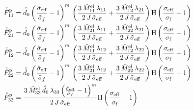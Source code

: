 \begin{align}
\dot{\tilde{F}}^{\mathrm p}_{11} &= \dot{\tilde{d}}_{0}\,{\left(\frac{\tilde{\sigma }_{\mathrm{eff}}}{\tilde{\sigma }_{f}}-1\right)}^m\,\left(\frac{3\,\tilde{M}_{11}^{\mathrm{el}}\,\lambda _{11}}{2\,J\,\tilde{\sigma }_{\mathrm{eff}}}+\frac{3\,\tilde{M}_{12}^{\mathrm{el}}\,\lambda _{21}}{2\,J\,\tilde{\sigma }_{\mathrm{eff}}}\right)\mathrm{H}\left( \frac{\sigma_{\rm{eff}}}{\sigma_{\rm{f}}} - 1\right)\\ 
\dot{\tilde{F}}^{\mathrm p}_{21} &= \dot{\tilde{d}}_{0}\,{\left(\frac{\tilde{\sigma }_{\mathrm{eff}}}{\tilde{\sigma }_{f}}-1\right)}^m\,\left(\frac{3\,\tilde{M}_{21}^{\mathrm{el}}\,\lambda _{11}}{2\,J\,\tilde{\sigma }_{\mathrm{eff}}}+\frac{3\,\tilde{M}_{22}^{\mathrm{el}}\,\lambda _{21}}{2\,J\,\tilde{\sigma }_{\mathrm{eff}}}\right) \mathrm{H}\left( \frac{\sigma_{\rm{eff}}}{\sigma_{\rm{f}}} - 1\right)\\ 
\dot{\tilde{F}}^{\mathrm p}_{12} &= \dot{\tilde{d}}_{0}\,{\left(\frac{\tilde{\sigma }_{\mathrm{eff}}}{\tilde{\sigma }_{f}}-1\right)}^m\,\left(\frac{3\,\tilde{M}_{11}^{\mathrm{el}}\,\lambda _{12}}{2\,J\,\tilde{\sigma }_{\mathrm{eff}}}+\frac{3\,\tilde{M}_{12}^{\mathrm{el}}\,\lambda _{22}}{2\,J\,\tilde{\sigma }_{\mathrm{eff}}}\right) \mathrm{H}\left( \frac{\sigma_{\rm{eff}}}{\sigma_{\rm{f}}} - 1\right)\\ 
\dot{\tilde{F}}^{\mathrm p}_{22} &= \dot{\tilde{d}}_{0}\,{\left(\frac{\tilde{\sigma }_{\mathrm{eff}}}{\tilde{\sigma }_{f}}-1\right)}^m\,\left(\frac{3\,\tilde{M}_{21}^{\mathrm{el}}\,\lambda _{12}}{2\,J\,\tilde{\sigma }_{\mathrm{eff}}}+\frac{3\,\tilde{M}_{22}^{\mathrm{el}}\,\lambda _{22}}{2\,J\,\tilde{\sigma }_{\mathrm{eff}}}\right) \mathrm{H}\left( \frac{\sigma_{\rm{eff}}}{\sigma_{\rm{f}}} - 1\right)\\ 
\dot{\tilde{F}}^{\mathrm p}_{33} &= \frac{3\,\tilde{M}_{33}^{\mathrm{el}}\,\dot{\tilde{d}}_{0}\,\lambda _{33}\,{\left(\frac{\tilde{\sigma }_{\mathrm{eff}}}{\tilde{\sigma }_{f}}-1\right)}^m}{2\,J\,\tilde{\sigma }_{\mathrm{eff}}} \mathrm{H}\left( \frac{\sigma_{\rm{eff}}}{\sigma_{\rm{f}}} - 1\right)
\end{align}
